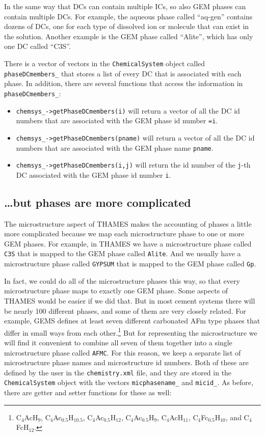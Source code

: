 \documentclass{article}
\begin{document}
In the same way that DCs can contain multiple ICs, so also GEM phases can contain
multiple DCs.  For example, the aqueous phase called ``aq-gen'' contains dozens
of DCs, one for each type of dissolved ion or molecule that can exist in the solution.
Another example is the GEM phase called ``Alite'', which has only one DC called ``C3S''.

There is a vector of vectors in the \verb!ChemicalSystem! object called
\verb!phaseDCmembers_! that stores a list of every DC that is associated with
each phase.  In addition, there are several functions that access the information
in \verb!phaseDCmembers_!:

\begin{itemize}
    \item \verb!chemsys_->getPhaseDCmembers(i)! will return a vector of all the
        DC id numbers that are associated with the GEM phase id number \verb!=i!.
    \item \verb!chemsys_->getPhaseDCmembers(pname)! will return a vector of all the
        DC id numbers that are associated with the GEM phase name \verb!pname!.
    \item \verb!chemsys_->getPhaseDCmembers(i,j)! will return the id number of the
        \verb!j!-th DC associated with the GEM phase id number \verb!i!.
\end{itemize}

\subsection{\ldots but phases are more complicated}
The microstructure aspect of THAMES makes the accounting of phases a little more
complicated because we map each microstructure phase to one or more
GEM phases.  For example, in THAMES we have a microstructure phase called \verb!C3S!
that is mapped to the GEM phase called \verb!Alite!.  And we usually have a
microstructure phase called \verb!GYPSUM! that is mapped to the GEM phase
called \verb!Gp!.

In fact, we could do all of the microstructure phases this way, so that every
microstructure phase maps to exactly one GEM phase.  Some aspects of THAMES would
be easier if we did that.  But in most cement systems there will be nearly 100
different phases, and some of them are very closely related.  For example,
GEMS defines at least seven different carbonated AFm type
phases that differ in small ways from each
other.\footnote{C$_4$AcH$_9$, C$_4$Ac$_{0.5}$H$_{10.5}$,
    C$_4$Ac$_{0.5}$H$_{12}$, C$_4$Ac$_{0.5}$H$_9$,
C$_4$AcH$_{11}$, C$_4$Fc$_{0.5}$H$_{10}$, and C$_4$FcH$_{12}$.}
But for representing the microstructure we
will find it convenient to combine
all seven of them together into a single microstructure phase called
\verb!AFMC!.  For this reason, we keep a separate list of microstructure phase
names and microstructure id numbers.  Both of these are defined by the user
in the \verb!chemistry.xml! file, and they are stored in the \verb!ChemicalSystem!
object with the vectors \verb!micphasename_! and \verb!micid_!.  As before,
there are getter and setter functions for these as well:
\end{document}
